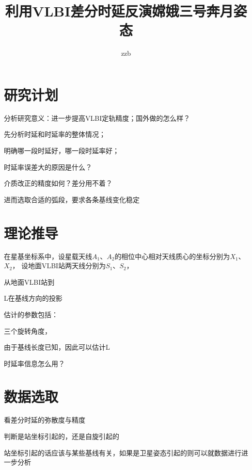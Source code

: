 \documentclass[12pt]{article}
\title{利用VLBI差分时延反演嫦娥三号奔月姿态\\ }
\author{zzb \\ }
\begin{document}
\maketitle

\section{研究计划}
分析研究意义：进一步提高VLBI定轨精度；国外做的怎么样？

先分析时延和时延率的整体情况；

明确哪一段时延好，哪一段时延率好；

时延率误差大的原因是什么？

介质改正的精度如何？差分用不着？


进而选取合适的弧段，要求各条基线变化稳定


\section{理论推导}

在星基坐标系中，设星载天线$A_1$、$A_2$的相位中心相对天线质心的坐标分别为$X_1$、$X_2$，
设地面VLBI站两天线分别为$S_1$、$S_2$，

从地面VLBI站到



L在基线方向的投影

估计的参数包括：

三个旋转角度，

由于基线长度已知，因此可以估计L


时延率信息怎么用？


\section{数据选取}
看差分时延的弥散度与精度



判断是站坐标引起的，还是自旋引起的

站坐标引起的话应该与某些基线有关，如果是卫星姿态引起的则可以就数据进行进一步分析






%
%
\end{document}
